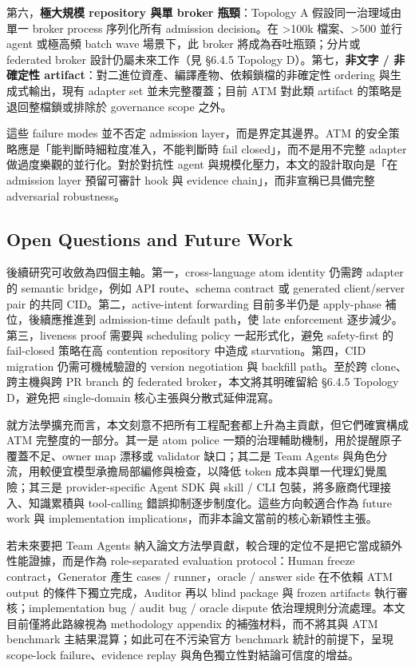 \documentclass[a4paper,fontset=none]{ctexart}
\begin{document}
第六，\textbf{極大規模 repository 與單 broker 瓶頸}：Topology A 假設同一治理域由單一 broker process 序列化所有 admission decision。在 >100k 檔案、>500 並行 agent 或極高頻 batch wave 場景下，此 broker 將成為吞吐瓶頸；分片或 federated broker 設計仍屬未來工作（見 §6.4.5 Topology D）。第七，\textbf{非文字 / 非確定性 artifact}：對二進位資產、編譯產物、依賴鎖檔的非確定性 ordering 與生成式輸出，現有 adapter set 並未完整覆蓋；目前 ATM 對此類 artifact 的策略是退回整檔鎖或排除於 governance scope 之外。

這些 failure modes 並不否定 admission layer，而是界定其邊界。ATM 的安全策略應是「能判斷時細粒度准入，不能判斷時 fail closed」，而不是用不完整 adapter 做過度樂觀的並行化。對於對抗性 agent 與規模化壓力，本文的設計取向是「在 admission layer 預留可審計 hook 與 evidence chain」，而非宣稱已具備完整 adversarial robustness。

\subsection{Open Questions and Future Work}

後續研究可收斂為四個主軸。第一，cross-language atom identity 仍需跨 adapter 的 semantic bridge，例如 API route、schema contract 或 generated client/server pair 的共同 CID。第二，active-intent forwarding 目前多半仍是 apply-phase 補位，後續應推進到 admission-time default path，使 late enforcement 逐步減少。第三，liveness proof 需要與 scheduling policy 一起形式化，避免 safety-first 的 fail-closed 策略在高 contention repository 中造成 starvation。第四，CID migration 仍需可機械驗證的 version negotiation 與 backfill path。至於跨 clone、跨主機與跨 PR branch 的 federated broker，本文將其明確留給 §6.4.5 Topology D，避免把 single-domain 核心主張與分散式延伸混寫。

就方法學擴充而言，本文刻意不把所有工程配套都上升為主貢獻，但它們確實構成 ATM 完整度的一部分。其一是 atom police 一類的治理輔助機制，用於提醒原子覆蓋不足、owner map 漂移或 validator 缺口；其二是 Team Agents 與角色分流，用較便宜模型承擔局部編修與檢查，以降低 token 成本與單一代理幻覺風險；其三是 provider-specific Agent SDK 與 skill / CLI 包裝，將多廠商代理接入、知識累積與 tool-calling 錯誤抑制逐步制度化。這些方向較適合作為 future work 與 implementation implications，而非本論文當前的核心新穎性主張。

若未來要把 Team Agents 納入論文方法學貢獻，較合理的定位不是把它當成額外性能證據，而是作為 role-separated evaluation protocol：Human freeze contract，Generator 產生 cases / runner，oracle / answer side 在不依賴 ATM output 的條件下獨立完成，Auditor 再以 blind package 與 frozen artifacts 執行審核；implementation bug / audit bug / oracle dispute 依治理規則分流處理。本文目前僅將此路線視為 methodology appendix 的補強材料，而不將其與 ATM benchmark 主結果混算；如此可在不污染官方 benchmark 統計的前提下，呈現 scope-lock failure、evidence replay 與角色獨立性對結論可信度的增益。
\end{document}
